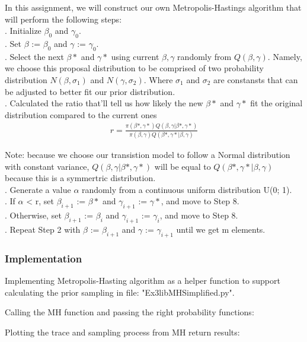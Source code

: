 \documentclass[a4paper]{article}
\begin{document}
    In this assignment, we will construct our own Metropolis-Hastings algorithm that will perform the following steps:
    \\
    . Initialize $\beta_0$ and $\gamma_0$.
    \\
    . Set $\beta$ := $\beta_0$ and $\gamma$ := $\gamma_0$.
    \\
    . Select the next $\beta*$ and $\gamma*$ using current $\beta, \gamma$ randomly from $Q(\beta, \gamma)$. Namely, we choose this proposal distribution to be comprised of two probability distribution $N(\beta, \sigma_1)$ and $N(\gamma, \sigma_2)$. Where $\sigma_1$ and $\sigma_2$ are constansts that can be adjusted to better fit our prior distribution.
    \\
    . Calculated the ratio that'll tell us how likely the new $\beta*$ and $\gamma*$ fit the original distribution compared to the current ones
    \begin{align*}
        r = \frac{\pi(\beta*, \gamma*)Q(\beta, \gamma|\beta*, \gamma*)}{\pi(\beta, \gamma)Q(\beta*, \gamma*|\beta, \gamma)}
    \end{align*}
    
    Note: because we choose our transistion model to follow a Normal distribution with constant variance, $Q(\beta, \gamma|\beta*, \gamma*)$ will be equal to $Q(\beta*, \gamma*|\beta, \gamma)$ because this is a symmertric distribution.
    \\
    . Generate a value $\alpha$ randomly from a continuous uniform distribution U(0; 1).
    \\
    . If $\alpha$ < r, set $\beta_{i+1}$ := $\beta*$ and $\gamma_{i+1}$ := $\gamma*$, and move to Step 8.
    \\
    . Otherwise, set $\beta_{i+1}$ := $\beta_i$ and $\gamma_{i+1}$ := $\gamma_i$, and move to Step 8.
    \\
    . Repeat Step 2 with $\beta$ := $\beta_{i+1}$ and $\gamma$ := $\gamma_{i+1}$ until we get m elements.
    \subsubsection{Implementation}
    Implementing Metropolis-Hasting algorithm as a helper function to support calculating the prior sampling in file: "Ex3libMHSimplified.py".   
    
    Calling the MH function and passing the right probability functions:
    
    Plotting the trace and sampling process from MH return results:
    
    
\end{document}
